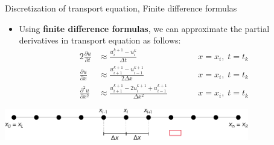 %
%
\begin{frame}{Discretization of transport equation, Finite difference formulas}

\begin{itemize}
\item Using \alert{\bf finite difference formulas}, we can approximate the partial derivatives in transport equation as follows:
%
\begin{alignat*}{2}
\frac{\partial u}{\partial t} & \approx\frac{u_{i}^{k+1}-u_{i}^{k}}{\Delta t} & \qquad & x=x_{i},\;t=t_{k}\\
\frac{\partial u}{\partial x} & \approx\frac{u_{i+1}^{k+1}-u_{i-1}^{k+1}}{2\Delta x} & \qquad & x=x_{i},\;t=t_{k}\\
\frac{\partial^{2}u}{\partial x^2} & \approx\frac{u_{i+1}^{k+1}-2u_{i}^{k+1}+u_{i-1}^{k+1}}{\Delta x^{2}} & \qquad & x=x_{i},\;t=t_{k}
\end{alignat*}
\end{itemize}

\vskip 20pt
\begin{center}
	\includegraphics[width=0.8\textwidth]{figures/reactive-transport/finite-difference-domain-discretization}
\end{center}

\end{frame}
%
%
